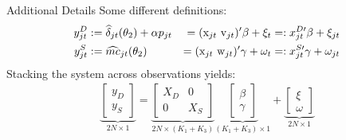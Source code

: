\begin{frame}{Additional Details}
Some different definitions:
\begin{alignat}{3}
\label{eq:stacked}
\nonumber y_{jt}^D &:= \widehat \delta_{jt}(\theta_2) + \alpha p_{jt} &=(\textrm{x}_{jt} \-\ \textrm{v}_{jt})' \beta + \xi_t &=: x_{jt}^{D\prime}\beta + \xi_{jt} \\ 
y_{jt}^S &:= \widehat{mc}_{jt}(\theta_2) &= (\textrm{x}_{jt} \-\ \textrm{w}_{jt})'\gamma + \omega_t &=: x_{jt}^{S\prime} \gamma + \omega_{jt} 
\end{alignat}
Stacking the system across observations yields:
\begin{align}
\underbrace{\begin{bmatrix} y_D \\ y_S \end{bmatrix}}_{2N\times1} = 
\underbrace{\begin{bmatrix}
X_D & 0 \\
0 & X_S 
\end{bmatrix}}_{2N\times(K_1+K_3)}
\underbrace{\begin{bmatrix}
\beta \\ \gamma %
\end{bmatrix}}_{(K_1+K_3)\times1} + 
\underbrace{\begin{bmatrix}
\xi \\ \omega %
\end{bmatrix}}_{2N\times 1}
\end{align}
\end{frame}



